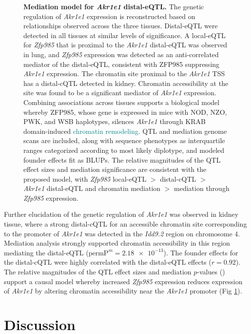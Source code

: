 \documentclass[10pt,letterpaper]{article}
\newcommand{\permpmed}{\text{permP}^{m}}
\newcommand{\GKinline}[1]{\textcolor{teal}{#1}}
\begin{document}
\begin{figure}[h!]
\caption{\textbf{Mediation model for \textit{Akr1e1} distal-eQTL.}  The genetic regulation of \textit{Akr1e1} expression is reconstructed based on relationships observed across the three tissues. Distal-eQTL were detected in all tissues at similar levels of significance. A local-eQTL for \textit{Zfp985} that is proximal to the \textit{Akr1e1} distal-eQTL was observed in lung, and \textit{Zfp985} expression was detected as an anti-correlated mediator of the distal-eQTL, consistent with ZFP985 suppressing \textit{Akr1e1} expression. The chromatin site proximal to the \textit{Akr1e1} TSS has a distal-cQTL detected in kidney. Chromatin accessibility at the site was found to be a significant mediator of \textit{Akr1e1} expression. Combining associations across tissues supports a biological model whereby ZFP985, whose gene is expressed in mice with NOD, NZO, PWK, and WSB haplotypes, silences \textit{Akr1e1} through KRAB domain-induced \GKinline{chromatin remodeling}. QTL and mediation genome scans are included, along with sequence phenotypes as interquartile ranges categorized according to most likely diplotype, and modeled founder effects fit as BLUPs. The relative magnitudes of the QTL effect sizes and mediation significance are consistent with the proposed model, with \textit{Zfp985} local-eQTL $>$ distal-cQTL $>$ \textit{Akr1e1} distal-eQTL and chromatin mediation $>$ mediation through \textit{Zfp985} expression.
\label{fig:akr1e1_full_model}}
\end{figure}
  
Further elucidation of the genetic regulation of \textit{Akr1e1} was observed in kidney tissue, where a strong distal-cQTL for an accessible chromatin site corresponding to the promoter of \textit{Akr1e1} was detected in the \textit{Idd9.2} region on chromosome 4. Mediation analysis strongly supported chromatin accessibility in this region mediating the distal-eQTL ($\permpmed = \num{2.18e-13}$). The founder effects for the distal-cQTL were highly correlated with the distal-eQTL effects ($r = 0.92$). The relative magnitudes of the QTL effect sizes and mediation $p$-values () support a causal model whereby increased \textit{Zfp985} expression reduces expression of \textit{Akr1e1} by altering chromatin accessibility near the \textit{Akr1e1} promoter (Fig \ref{fig:akr1e1_full_model}). 

\section*{Discussion}
\end{document}
